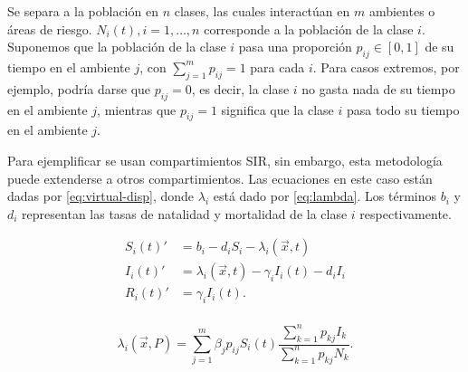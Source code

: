 
Se separa a la población en \(n\) clases, las cuales interactúan en \(m\) ambientes o áreas de riesgo. \(N_i(t), i = 1, \dots, n\) corresponde a la población de la clase \(i\). Suponemos que la población de la clase \(i\) pasa una proporción \(p_{ij} \in [0,1]\) de su tiempo en el ambiente \(j\), con \(\sum_{j = 1}^{m} p_{ij} = 1\) para cada \(i\). Para casos extremos, por ejemplo, podría darse que \(p_{ij} = 0\), es decir, la clase \(i\) no gasta nada de su tiempo en el ambiente \(j\), mientras que \(p_{ij} = 1\) significa que la clase \(i\) pasa todo su tiempo en el ambiente \(j\). 

Para ejemplificar se usan compartimientos SIR, sin embargo, esta metodología puede extenderse a otros compartimientos. Las ecuaciones en este caso están dadas por \ref{eq:virtual-disp}, donde \(\lambda_i\) está dado por \ref{eq:lambda}. Los términos \(b_i\) y \(d_i\) representan las tasas de natalidad y mortalidad de la clase \(i\) respectivamente.

\begin{equation}\label{eq:virtual-disp}
\begin{aligned}
S_i(t)' &=  b_i - d_i S_i - {\lambda_i(\vec{x}, t) } \\
I_i(t)' &= {\lambda_i(\vec{x}, t) } - \gamma_i I_i(t) - d_i I_i\\
R_i(t)' &= \gamma_i I_i(t).\\ 
\end{aligned}
\end{equation}

\begin{equation}\label{eq:lambda}
\lambda_i(\vec{x}, P) = \sum_{j=1}^m \beta_{j}p_{ij}S_i(t)\frac{\sum_{k=1}^{n} p_{kj} I_k}{\sum_{k=1}^{n} p_{kj}N_k}.
\end{equation}


